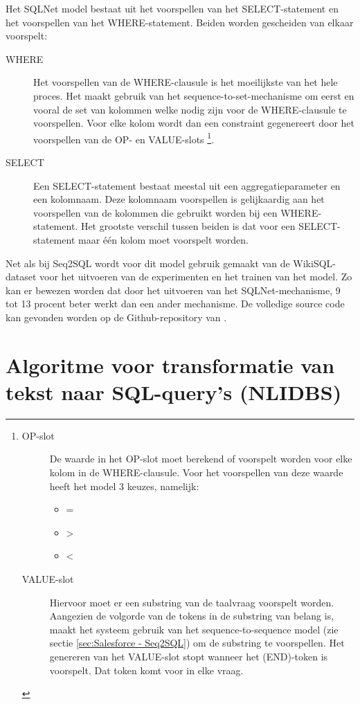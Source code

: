 Het SQLNet model bestaat uit het voorspellen van het SELECT-statement en het voorspellen van het WHERE-statement. Beiden worden gescheiden van elkaar voorspelt:
\begin{description}
	\item[WHERE] Het voorspellen van de WHERE-clausule is het moeilijkste van het hele proces. Het maakt gebruik van het sequence-to-set-mechanisme om eerst en vooral de set van kolommen welke nodig zijn voor de WHERE-clausule te voorspellen. Voor elke kolom wordt dan een constraint gegenereert door het voorspellen van de OP- en VALUE-slots 
	\footnote{
		\begin{description}
			\item[OP-slot] De waarde in het OP-slot moet berekend of voorspelt worden voor elke kolom in de WHERE-clausule. Voor het voorspellen van deze waarde heeft het model 3 keuzes, namelijk:
			\begin{itemize}
				\item =
				\item >
				\item <
			\end{itemize}
			\item[VALUE-slot] Hiervoor moet er een substring van de taalvraag voorspelt worden. Aangezien de volgorde van de tokens  in de substring van belang is, maakt het systeem gebruik van het sequence-to-sequence model (zie sectie \ref{sec:Salesforce - Seq2SQL}) om de substring te voorspellen. Het genereren van het VALUE-slot stopt wanneer het (END)-token is voorspelt. Dat token komt voor in elke vraag.
		\end{description}
	}.
	\item[SELECT] Een SELECT-statement bestaat meestal uit een aggregatieparameter en een kolomnaam. Deze kolomnaam voorspellen is gelijkaardig aan het voorspellen van de kolommen die gebruikt worden bij een WHERE-statement. Het grootste verschil tussen beiden is dat voor een SELECT-statement maar één kolom moet voorspelt worden.
\end{description}

Net als bij Seq2SQL wordt voor dit model gebruik gemaakt van de WikiSQL-dataset voor het uitvoeren van de experimenten en het trainen van het model. Zo kan er bewezen worden dat door het uitvoeren van het SQLNet-mechanisme, 9 tot 13 procent beter werkt dan een ander mechanisme. De volledige source code kan gevonden worden op de Github-repository van \textcite{sqlnet}.

\section{Algoritme voor transformatie van tekst naar SQL-query's (NLIDBS)}

